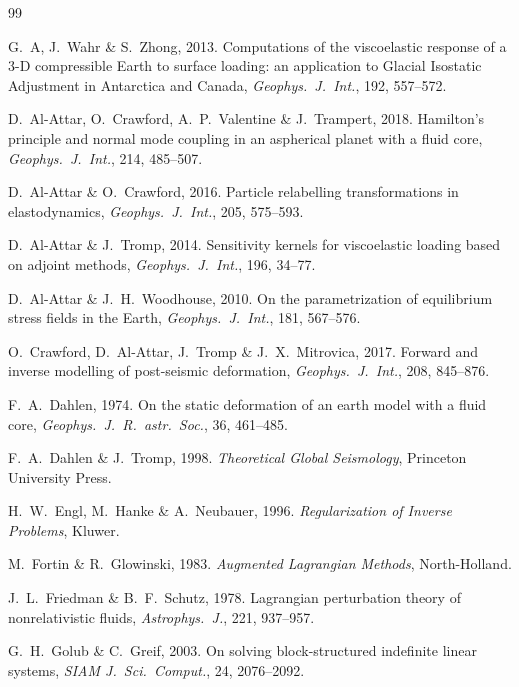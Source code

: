 \documentclass[11pt]{article}
\numberwithin{equation}{section}
\theoremstyle{remark}
\begin{document}
\begin{thebibliography}{99}

G.~A, J.~Wahr \& S.~Zhong, 2013.
Computations of the viscoelastic response of a 3-D compressible Earth to
surface loading: an application to Glacial Isostatic Adjustment in
Antarctica and Canada, \emph{Geophys.\ J.\ Int.}, 192, 557--572.

D.~Al-Attar, O.~Crawford, A.~P.~Valentine \& J.~Trampert, 2018.
Hamilton's principle and normal mode coupling in an aspherical planet with
a fluid core, \emph{Geophys.\ J.\ Int.}, 214, 485--507.

D.~Al-Attar \& O.~Crawford, 2016.
Particle relabelling transformations in elastodynamics,
\emph{Geophys.\ J.\ Int.}, 205, 575--593.

D.~Al-Attar \& J.~Tromp, 2014.
Sensitivity kernels for viscoelastic loading based on adjoint methods,
\emph{Geophys.\ J.\ Int.}, 196, 34--77.

D.~Al-Attar \& J.~H.~Woodhouse, 2010.
On the parametrization of equilibrium stress fields in the Earth,
\emph{Geophys.\ J.\ Int.}, 181, 567--576.

O.~Crawford, D.~Al-Attar, J.~Tromp \& J.~X.~Mitrovica, 2017.
Forward and inverse modelling of post-seismic deformation,
\emph{Geophys.\ J.\ Int.}, 208, 845--876.

F.~A.~Dahlen, 1974.
On the static deformation of an earth model with a fluid core,
\emph{Geophys.\ J.\ R.\ astr.\ Soc.}, 36, 461--485.

F.~A.~Dahlen \& J.~Tromp, 1998.
\emph{Theoretical Global Seismology}, Princeton University Press.

H.~W.~Engl, M.~Hanke \& A.~Neubauer, 1996.
\emph{Regularization of Inverse Problems}, Kluwer.

M.~Fortin \& R.~Glowinski, 1983.
\emph{Augmented Lagrangian Methods}, North-Holland.

J.~L.~Friedman \& B.~F.~Schutz, 1978.
Lagrangian perturbation theory of nonrelativistic fluids,
\emph{Astrophys.\ J.}, 221, 937--957.

G.~H.~Golub \& C.~Greif, 2003.
On solving block-structured indefinite linear systems,
\emph{SIAM J.\ Sci.\ Comput.}, 24, 2076--2092.


\end{thebibliography}
\end{document}
